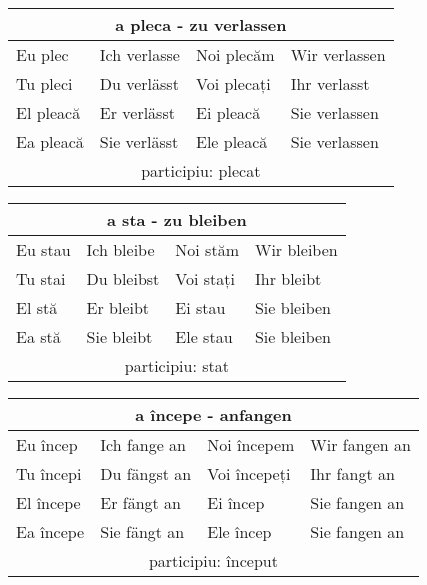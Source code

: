 \documentclass[11pt, oneside]{article}
\begin{document}
%
\begin{center}
  \begin{tabular}{ |p{3.25cm}|p{3.25cm}||p{3.25cm}|p{3.25cm}| }
      \hline
      \multicolumn{4}{|c|}{a pleca - zu verlassen} \\
      \hline
      \hline
      Eu plec & Ich verlasse & Noi plecăm & Wir verlassen\\
      \hline
      Tu pleci & Du verlässt & Voi plecați & Ihr verlasst\\
      \hline
      El pleacă & Er verlässt & Ei pleacă & Sie verlassen\\ 
      Ea pleacă & Sie verlässt & Ele pleacă & Sie verlassen\\
      \hline
      \multicolumn{4}{|c|}{participiu: plecat} \\
      \hline
     \end{tabular}
\end{center}
%
\begin{center}
  \begin{tabular}{ |p{3.25cm}|p{3.25cm}||p{3.25cm}|p{3.25cm}| }
      \hline
      \multicolumn{4}{|c|}{a sta - zu bleiben} \\
      \hline
      \hline
      Eu stau & Ich bleibe & Noi stăm & Wir bleiben\\
      \hline
      Tu stai & Du bleibst & Voi stați & Ihr bleibt\\
      \hline
      El stă & Er bleibt & Ei stau & Sie bleiben\\ 
      Ea stă & Sie bleibt & Ele stau & Sie bleiben\\
      \hline
      \multicolumn{4}{|c|}{participiu: stat} \\
      \hline
     \end{tabular}
\end{center}
%
\begin{center}
  \begin{tabular}{ |p{3.25cm}|p{3.25cm}||p{3.25cm}|p{3.25cm}| }
      \hline
      \multicolumn{4}{|c|}{a începe - anfangen} \\
      \hline
      \hline
      Eu încep & Ich fange an & Noi începem & Wir fangen an\\
      \hline
      Tu începi & Du fängst an & Voi începeți & Ihr fangt an\\
      \hline
      El începe & Er fängt an & Ei încep & Sie fangen an\\ 
      Ea începe & Sie fängt an & Ele încep & Sie fangen an\\
      \hline
      \multicolumn{4}{|c|}{participiu: început} \\
      \hline
     \end{tabular}
\end{center}
\end{document}
